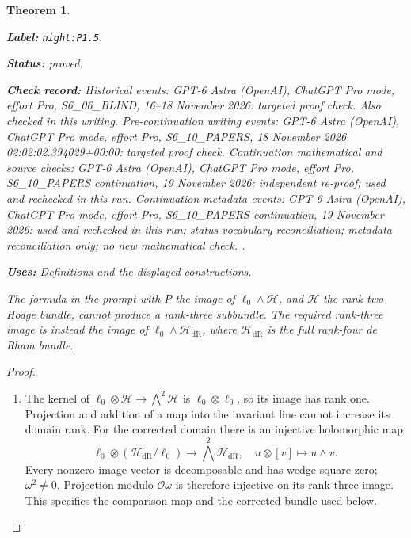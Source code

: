 \documentclass[11pt,a4paper]{article}
\newtheorem{theorem}{Theorem}[section]
\theoremstyle{definition}
\newcommand{\StatementRecord}[4]{\par\smallskip\begingroup\upshape\raggedright\noindent\textbf{Label:} \nolinkurl{#1}.\par\noindent\textbf{Status:} #2.\par\noindent\textbf{Check record:} #3.\par\noindent\textbf{Uses:} #4.\par\endgroup\smallskip}
\begin{document}
\begin{theorem}\label{night:P1.5}
\StatementRecord{night:P1.5}{proved}{Historical events: GPT-6 Astra (OpenAI), ChatGPT Pro mode, effort Pro, S6\_06\_BLIND, 16--18 November 2026: targeted proof check. Also checked in this writing. Pre-continuation writing events: GPT-6 Astra (OpenAI), ChatGPT Pro mode, effort Pro, S6\_10\_PAPERS, 18 November 2026 02:02:02.394029+00:00: targeted proof check. Continuation mathematical and source checks: GPT-6 Astra (OpenAI), ChatGPT Pro mode, effort Pro, S6\_10\_PAPERS continuation, 19 November 2026: independent re-proof; used and rechecked in this run. Continuation metadata events: GPT-6 Astra (OpenAI), ChatGPT Pro mode, effort Pro, S6\_10\_PAPERS continuation, 19 November 2026: used and rechecked in this run; status-vocabulary reconciliation; metadata reconciliation only; no new mathematical check. }{Definitions and the displayed constructions}
The formula in the prompt with $P$ the image of
$\ell_0\wedge\mathcal H$, and $\mathcal H$ the rank-two Hodge bundle,
cannot produce a rank-three subbundle.  The required rank-three image
is instead the image of $\ell_0\wedge\mathcal H_{\mathrm{dR}}$, where
$\mathcal H_{\mathrm{dR}}$ is the full rank-four de Rham bundle.
\end{theorem}
\begin{proof}
\begin{enumerate}[label=\arabic*.]
\item The kernel of $\ell_0\otimes\mathcal H\to\bigwedge^2\mathcal H$
is $\ell_0\otimes\ell_0$, so its image has rank one.  Projection and
addition of a map into the invariant line cannot increase its domain
rank.  For the corrected domain there is an injective holomorphic map
\[
\ell_0\otimes(\mathcal H_{\mathrm{dR}}/\ell_0)
 \longrightarrow\bigwedge^2\mathcal H_{\mathrm{dR}},\quad
u\otimes[v]\longmapsto u\wedge v.
\]
Every nonzero image vector is decomposable and has wedge square zero;
$\omega^2\ne0$.  Projection modulo $\mathcal O\omega$ is therefore
injective on its rank-three image.  This specifies the comparison map
and the corrected bundle used below.

\end{enumerate}
\end{proof}
\end{document}
